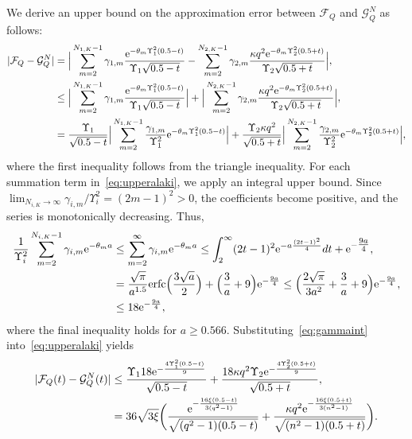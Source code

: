 \documentclass[journal,12pt,onecolumn,draftclsnofoot]{IEEEtran}
\theoremstyle{definition}
\begin{document}
We derive an upper bound on the approximation error between $\mathcal{F}_Q$ and $\mathcal{G}_Q^{N}$ as follows:
\begin{align}
 \nonumber
    |\mathcal{F}_Q -\mathcal{G}_Q^{N}|& = \Big|\sum_{m=2}^{N_{1,K}-1}\gamma_{1,m} \frac{{\rm e}^{-\theta_m \Upsilon_1^2(0.5-t)}}{\Upsilon_1\sqrt{0.5-t}}-\sum_{m=2}^{N_{2,K}-1}\gamma_{2,m}\frac{\kappa q^2{\rm e}^{-\theta_m\Upsilon_2^2(0.5+t)}}{\Upsilon_2\sqrt{0.5+t}}\Big|,\\ \nonumber
    & \leq\Big|\sum_{m=2}^{N_{1,K}-1}\gamma_{1,m}\frac{{\rm e}^{-\theta_m \Upsilon_1^2(0.5-t)}}{\Upsilon_1\sqrt{0.5-t}}\Big|+\Big|\sum_{m=2}^{N_{2,K}-1}\gamma_{2,m}\frac{\kappa q^2{\rm e}^{-\theta_m\Upsilon_2^2(0.5+t)}}{\Upsilon_2\sqrt{0.5+t}}\Big|, \nonumber \\
    & = \frac{\Upsilon_1}{\sqrt{0.5-t}} \Big|\sum_{m=2}^{N_{1,K}-1}\frac{\gamma_{1,m}}{\Upsilon_1^2} {\rm e}^{-\theta_m \Upsilon_1^2(0.5-t)}\Big|+\frac{\Upsilon_2\kappa q^2}{\sqrt{0.5+t}}\Big|\sum_{m=2}^{N_{2,K}-1}\frac{\gamma_{2,m}}{\Upsilon_2^2}{\rm e}^{-\theta_m\Upsilon_2^2(0.5+t)}\Big|,\label{eq:upperalaki}
\end{align}
where the first inequality follows from the triangle inequality.  
For each summation term in~\eqref{eq:upperalaki}, we apply an integral upper bound. 
Since $\lim_{N_{i,K} \to \infty} \gamma_{i,m}/\Upsilon_i^2 = (2m - 1)^2 > 0$, the coefficients become positive, and the series is monotonically decreasing. Thus,
\begin{align}
    \nonumber
    \frac{1}{\Upsilon_i^2}\sum_{m=2}^{N_{i,K}-1}\gamma_{i,m}{\rm e}^{-\theta_m a}  & \leq \sum_{m=2}^{\infty }\gamma_{i,m}{\rm e}^{-\theta_m a} \leq \int_{2}^{\infty}(2t-1)^2{\rm e}^{-a\frac{(2t-1)^2}{4}} dt + {\rm e}^{-\tfrac{9a}{4}},\\&= \frac{\sqrt{\pi}}{a^{1.5}} {\rm erfc}\Big(\frac{3 \sqrt{a}}{2}\Big) + \Big(\frac{3}{a}+9\Big){\rm e}^{-\frac{9a}{4}} \leq \Big(\frac{2\sqrt{\pi}}{3a^2}+\frac{3}{a} + 9\Big){\rm e}^{-\frac{9a}{4}},\nonumber \\
    & \leq 18 {\rm e}^{-\frac{9a}{4}},
     \label{eq:gammaint}
\end{align}
where the final inequality holds for $a \ge 0.566$. 
Substituting~\eqref{eq:gammaint} into~\eqref{eq:upperalaki} yields
\begin{align}
\nonumber
    |\mathcal{F}_Q(t) -\mathcal{G}_Q^{N}(t)| & \leq \frac{\Upsilon_118{\rm e}^{-\frac{4\Upsilon_1^2(0.5-t)}{9}}}{\sqrt{0.5-t}} + \frac{18\kappa q^2\Upsilon_2{\rm e}^{-\frac{4\Upsilon_2^2(0.5+t)}{9}}}{\sqrt{0.5+t}},\\
    & = 36\sqrt{3\xi}  \bigg( \frac{{\rm e}^{-\frac{16\xi(0.5-t)}{3(q^2-1)}}}{\sqrt{(q^2-1)(0.5-t)}} + \frac{\kappa q^2 {\rm e}^{-\frac{16\xi(0.5+t)}{3(n^2-1)}}}{\sqrt{(n^2-1){(0.5+t)}}}\bigg).
\end{align}
\end{document}
